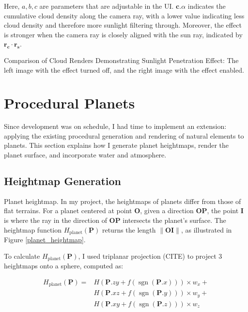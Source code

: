 Here, $a,b,c$ are parameters that are adjustable in the UI. $\mathbf{c}.\alpha$ indicates the cumulative cloud density along the camera ray, with a lower value indicating less cloud density and therefore more sunlight filtering through. Moreover, the effect is stronger when the camera ray is closely aligned with the sun ray, indicated by $\mathbf{r_c}\cdot \mathbf{r_s}$.

{Comparison of Cloud Renders Demonstrating Sunlight Penetration Effect: The left image with the effect turned off, and the right image with the effect enabled.}

\section{Procedural Planets}

Since development was on schedule, I had time to implement an extension: applying the existing procedural generation and rendering of natural elements to planets. This section explains how I generate planet heightmaps, render the planet surface, and incorporate water and atmosphere.

\subsection{Heightmap Generation}

{Planet heightmap.}{
In my project, the heightmaps of planets differ from those of flat terrains. For a planet centered at point $\mathbf{O}$, given a direction $\mathbf{OP}$, the point $\mathbf{I}$ is where the ray in the direction of $\mathbf{OP}$ intersects the planet's surface. The heightmap function $H_{\text{planet}} (\mathbf{P})$ returns the length $\|\mathbf{OI}\|$, as illustrated in Figure \ref{planet_heightmap}.
}

To calculate $H_\text{planet} (\mathbf{P})$, I used triplanar projection (CITE) to project 3 heightmaps onto a sphere, computed as:

\begin{equation}
\begin{aligned}
H_\text{planet} (\mathbf{P}) = 
&H(\mathbf{P}.zy + f(\operatorname{sgn}(\mathbf{P}.x))) \times w_{x}+ \\
&H(\mathbf{P}.xz + f(\operatorname{sgn}(\mathbf{P}.y))) \times w_{y}+ \\
&H(\mathbf{P}.xy + f(\operatorname{sgn}(\mathbf{P}.z))) \times w_{z}
\end{aligned}
\end{equation}

